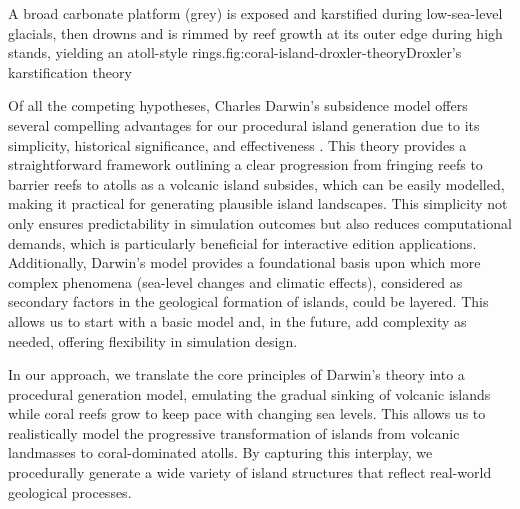 \begin{Itemize}
    {A broad carbonate platform (grey) is exposed and karstified during low-sea-level glacials, then drowns and is rimmed by reef growth at its outer edge during high stands, yielding an atoll-style rings.}{fig:coral-island-droxler-theory}{Droxler's karstification theory}

\end{Itemize}

Of all the competing hypotheses, Charles Darwin's subsidence model offers several compelling advantages for our procedural island generation due to its simplicity, historical significance, and effectiveness \cite{Tomascik1997}. This theory provides a straightforward framework outlining a clear progression from fringing reefs to barrier reefs to atolls as a volcanic island subsides, which can be easily modelled, making it practical for generating plausible island landscapes. This simplicity not only ensures predictability in simulation outcomes but also reduces computational demands, which is particularly beneficial for interactive edition applications. Additionally, Darwin's model provides a foundational basis upon which more complex phenomena (sea-level changes and climatic effects), considered as secondary factors in the geological formation of islands, could be layered. This allows us to start with a basic model and, in the future, add complexity as needed, offering flexibility in simulation design.

In our approach, we translate the core principles of Darwin's theory into a procedural generation model, emulating the gradual sinking of volcanic islands while coral reefs grow to keep pace with changing sea levels. This allows us to realistically model the progressive transformation of islands from volcanic landmasses to coral-dominated atolls. By capturing this interplay, we procedurally generate a wide variety of island structures that reflect real-world geological processes.

